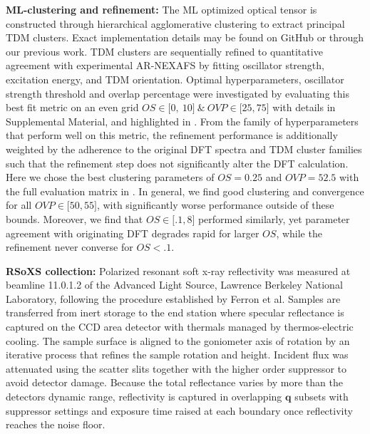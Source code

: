 \textbf{ML-clustering and refinement:} The ML optimized optical tensor is constructed through hierarchical agglomerative clustering to extract principal TDM clusters. Exact implementation details may be found on GitHub or through our previous work.\autocite{murciaQuantitativeBondTraceableResonant2026,victormurciaWSUCarbonLabDFTClustering2025} TDM clusters are sequentially refined to quantitative agreement with experimental AR-NEXAFS by fitting oscillator strength, excitation energy, and TDM orientation. Optimal hyperparameters, oscillator strength threshold and overlap percentage were investigated by evaluating this best fit metric on an even grid \(OS \in \lbrack 0,\ 10\rbrack\ \&\ OVP \in \lbrack 25,75\rbrack\) with details in Supplemental Material,  and highlighted in . From the family of hyperparameters that perform well on this metric, the refinement performance is additionally weighted by the adherence to the original DFT spectra and TDM cluster families such that the refinement step does not significantly alter the DFT calculation. Here we chose the best clustering parameters of \(OS = 0.25\) and \(OVP = 52.5\) with the full evaluation matrix in . In general, we find good clustering and convergence for all \(OVP \in \lbrack 50,55\rbrack\), with significantly worse performance outside of these bounds. Moreover, we find that \(OS \in \lbrack.1,8\rbrack\) performed similarly, yet parameter agreement with originating DFT degrades rapid for larger \(OS\), while the refinement never converse for \(OS < .1\).

\textbf{RSoXS collection:} Polarized resonant soft x-ray reflectivity was measured at beamline 11.0.1.2 of the Advanced Light Source, Lawrence Berkeley National Laboratory, following the procedure established by Ferron et al.\autocite{ferronCompositionDictatesMolecular2023} Samples are transferred from inert storage to the end station where specular reflectance is captured on the CCD area detector with thermals managed by thermos-electric cooling. The sample surface is aligned to the goniometer axis of rotation by an iterative process that refines the sample rotation and height. Incident flux was attenuated using the scatter slits together with the higher order suppressor to avoid detector damage. Because the total reflectance varies by more than the detectors dynamic range, reflectivity is captured in overlapping \(\mathbf{q}\) subsets with suppressor settings and exposure time raised at each boundary once reflectivity reaches the noise floor.

